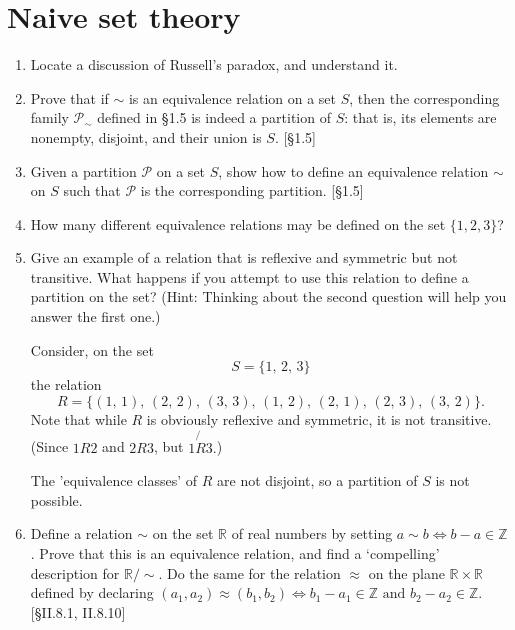 \section{Naive set theory}
\begin{enumerate}
    \item Locate a discussion of Russell's paradox, and understand it.

    \item Prove that if $\sim$ is an equivalence relation on a set $S$, then the corresponding family $\mathcal{P}_{\sim}$ defined in \S1.5 is indeed a partition of $S$: that is, its elements are nonempty, disjoint, and their union is $S$. [\S1.5]

    \item Given a partition $\mathcal{P}$ on a set $S$, show how to define an equivalence relation $\sim$ on $S$ such that $\mathcal{P}$ is the corresponding partition. [\S1.5]

    \item How many different equivalence relations may be defined on the set $\{1, 2, 3\}$?

    \item Give an example of a relation that is reflexive and symmetric but not transitive. What happens if you attempt to use this relation to define a partition on the set? (Hint: Thinking about the second question will help you answer the first one.)
    
    \begin{solution}
        Consider, on the set
        \[ S = \{1, \, 2, \, 3\} \]  
        the relation
        \[
            R = \{(1, \, 1), \, (2, \, 2), \, (3, \, 3), \, (1, \, 2), \, (2, \, 1), \, (2, \, 3), \, (3, \, 2)\}.
        \]
        Note that while $R$ is obviously reflexive and symmetric, it is not transitive. (Since $1R2$ and $2R3$, but $1 \not{R} 3.$)

        The 'equivalence classes' of $R$ are not disjoint, so a partition of $S$ is not possible.
    \end{solution}

    \item Define a relation $\sim$ on the set $\mathbb{R}$ of real numbers by setting $a \sim b \iff b-a \in \mathbb{Z}$. Prove that this is an equivalence relation, and find a `compelling' description for $\mathbb{R}/\sim$. Do the same for the relation $\approx$ on the plane $\mathbb{R} \times \mathbb{R}$ defined by declaring $(a_1, a_2) \approx (b_1, b_2) \iff b_1 - a_1 \in \mathbb{Z} \text{ and } b_2 - a_2 \in \mathbb{Z}$. [\S II.8.1, II.8.10]
\end{enumerate}
